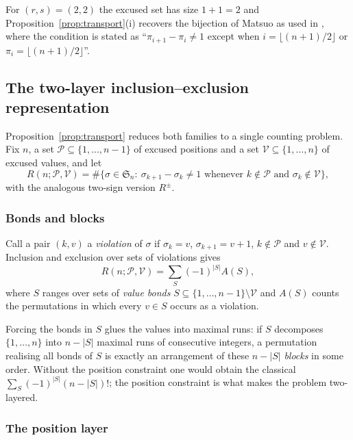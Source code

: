 \documentclass[11pt]{article}
\theoremstyle{definition}
\newcommand{\Sn}{\mathfrak{S}_n}
\begin{document}
For $(r,s)=(2,2)$ the excused set has size $1+1=2$ and
Proposition~\ref{prop:transport}(i) recovers the bijection of Matsuo as used in
\cite{SZ}, where the condition is stated as ``$\pi_{i+1}-\pi_i\ne1$ except when
$i=\lfloor(n+1)/2\rfloor$ or $\pi_i=\lfloor(n+1)/2\rfloor$''.

\subsection{The two-layer inclusion--exclusion representation}

Proposition~\ref{prop:transport} reduces both families to a single counting
problem. Fix $n$, a set $\mathcal P\subseteq\{1,\dots,n-1\}$ of excused
positions and a set $\mathcal V\subseteq\{1,\dots,n\}$ of excused values, and
let
\[
  R(n;\mathcal P,\mathcal V)
  =\#\bigl\{\sigma\in\Sn:\ \sigma_{k+1}-\sigma_k\ne1
    \text{ whenever }k\notin\mathcal P\text{ and }\sigma_k\notin\mathcal V\bigr\},
\]
with the analogous two-sign version $R^{\pm}$.

\subsubsection*{Bonds and blocks}

Call a pair $(k,v)$ a \emph{violation} of $\sigma$ if $\sigma_k=v$,
$\sigma_{k+1}=v+1$, $k\notin\mathcal P$ and $v\notin\mathcal V$. Inclusion and
exclusion over sets of violations gives
\begin{equation}\label{eq:ie1}
  R(n;\mathcal P,\mathcal V)=\sum_{S}(-1)^{|S|}A(S),
\end{equation}
where $S$ ranges over sets of \emph{value bonds}
$S\subseteq\{1,\dots,n-1\}\setminus\mathcal V$ and $A(S)$ counts the
permutations in which every $v\in S$ occurs as a violation.

Forcing the bonds in $S$ glues the values into maximal runs: if $S$ decomposes
$\{1,\dots,n\}$ into $n-|S|$ maximal runs of consecutive integers, a
permutation realising all bonds of $S$ is exactly an arrangement of these
$n-|S|$ \emph{blocks} in some order. Without the position constraint one would
obtain the classical $\sum_S(-1)^{|S|}(n-|S|)!$; the position constraint is
what makes the problem two-layered.

\subsubsection*{The position layer}
\end{document}
